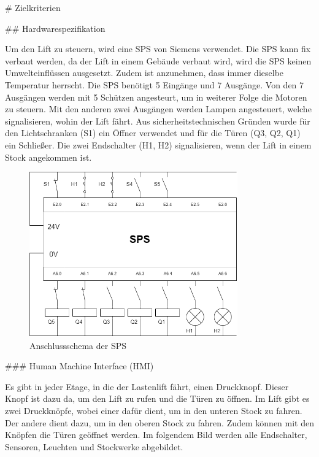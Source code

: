 \begin{markdown}
# Zielkriterien

## Hardwarespezifikation

Um den Lift zu steuern, wird eine SPS von Siemens verwendet. Die SPS kann fix verbaut werden, da der Lift in einem Gebäude verbaut wird, wird die SPS keinen Umwelteinflüssen ausgesetzt. Zudem ist anzunehmen, dass immer dieselbe Temperatur herrscht. Die SPS benötigt 5 Eingänge und 7 Ausgänge. Von den 7 Ausgängen werden mit 5 Schützen angesteurt, um in weiterer Folge die Motoren zu steuern. Mit den anderen zwei Ausgängen werden Lampen angesteuert, welche signalisieren, wohin der Lift fährt. Aus sicherheitstechnischen Gründen wurde für den Lichtschranken (S1) ein Öffner verwendet und für die Türen (Q3, Q2, Q1) ein Schließer. Die zwei Endschalter (H1, H2) signalisieren, wenn der Lift in einem Stock angekommen ist.

\begin{figure}[h!]
    \centering
    \includegraphics[width=0.8\textwidth]{./images/Anschlussschema.png}
    \caption[Anschlussschema der SPS]{Anschlussschema der SPS}
\end{figure}

### Human Machine Interface (HMI)

Es gibt in jeder Etage, in die der Lastenlift fährt, einen Druckknopf. Dieser Knopf ist dazu da, um den Lift zu rufen und die Türen zu öffnen. Im Lift gibt es zwei Druckknöpfe, wobei einer dafür dient, um in den unteren Stock zu fahren. Der andere dient dazu, um in den oberen Stock zu fahren. Zudem können mit den Knöpfen die Türen geöffnet werden. Im folgendem Bild werden alle Endschalter, Sensoren, Leuchten und Stockwerke abgebildet.


\end{markdown}
